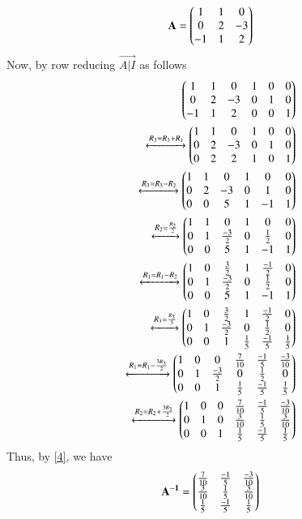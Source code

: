 \documentclass[journal,12pt,twocolumn]{IEEEtran}
\begin{document}
\begin{align}
\mathbf{A} = \begin{pmatrix}1 & 1 &  0 \\ 0 & 2 & -3  \\ -1 & 1 & 2 \end{pmatrix}
\end{align}
Now, by row reducing $\vec{A|I}$ as follows 
\begin{align}
\begin{pmatrix}1 & 1 & 0 & 1& 0 &0  \\ 0 & 2 & -3 & 0& 1&0 \\ -1 & 1 & 2& 0& 0 &1\end{pmatrix}\\ \xleftrightarrow[]{R_3=R_3+R_1}\begin{pmatrix}1 & 1 & 0 & 1& 0 &0  \\ 0 & 2 & -3 & 0& 1&0 \\ 0 & 2 & 2& 1& 0 &1\end{pmatrix}\\
\xleftrightarrow[]{R_3=R_3-R_2}\begin{pmatrix}1 & 1 & 0 & 1& 0 &0  \\ 0 & 2 & -3 & 0& 1&0 \\ 0 & 0 & 5& 1& -1 &1\end{pmatrix}\\
\xleftrightarrow[]{R_2=\frac{R_2}{2}}\begin{pmatrix}1 & 1 & 0 & 1& 0 &0  \\ 0 & 1 & \frac{-3}{2} & 0& \frac{1}{2}&0 \\ 0 & 0 & 5& 1& -1 &1\end{pmatrix}\\
\xleftrightarrow[]{R_1=R_1-R_2}\begin{pmatrix}1 & 0 & \frac{3}{2} & 1& \frac{-1}{2} &0  \\ 0 & 1 & \frac{-3}{2} & 0& \frac{1}{2}&0 \\ 0 & 0 & 5& 1& -1 &1\end{pmatrix}\\
\xleftrightarrow[]{R_3=\frac{R_3}{5}}\begin{pmatrix}1 & 0 & \frac{3}{2} & 1& \frac{-1}{2} &0  \\ 0 & 1 & \frac{-3}{2} & 0& \frac{1}{2}&0 \\ 0 & 0 & 1& \frac{1}{5}& \frac{-1}{5} &\frac{1}{5}\end{pmatrix}\\
\xleftrightarrow[]{R_1=R_1-\frac{3R_3}{2}}\begin{pmatrix}1 & 0 & 0 & \frac{7}{10}& \frac{-1}{5} &\frac{-3}{10} \\ 0 & 1 & \frac{-3}{2} & 0& \frac{1}{2}&0 \\ 0 & 0 & 1& \frac{1}{5}& \frac{-1}{5} &\frac{1}{5}\end{pmatrix}\\
\xleftrightarrow[]{R_2=R_2+\frac{3R_3}{2}}\begin{pmatrix}1 & 0 & 0 & \frac{7}{10}& \frac{-1}{5} &\frac{-3}{10} \\ 0 & 1 & 0 & \frac{3}{10}& \frac{1}{5}&\frac{3}{10} \\ 0 & 0 & 1& \frac{1}{5}& \frac{-1}{5} &\frac{1}{5}\end{pmatrix}	\label{4}
\end{align}
Thus, by \eqref{4}, we have
\begin{align}
	\mathbf{A^{-1}}= \begin{pmatrix} \frac{7}{10}& \frac{-1}{5} &\frac{-3}{10} \\ \frac{3}{10}& \frac{1}{5}&\frac{3}{10} \\  \frac{1}{5}& \frac{-1}{5} &\frac{1}{5}\end{pmatrix}
\end{align}
\end{document}
